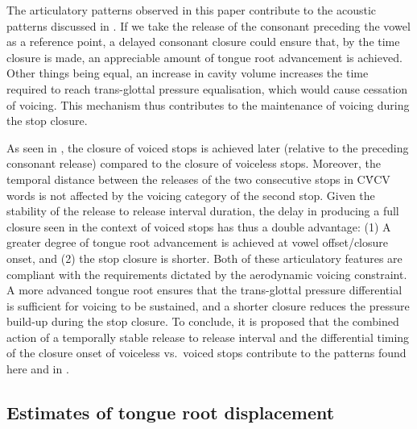 \documentclass[
  12pt,
]{article}
\begin{document}
The articulatory patterns observed in this paper contribute to the
acoustic patterns discussed in \citet{coretta2018j}. If we take the
release of the consonant preceding the vowel as a reference point, a
delayed consonant closure could ensure that, by the time closure is
made, an appreciable amount of tongue root advancement is achieved.
Other things being equal, an increase in cavity volume increases the
time required to reach trans-glottal pressure equalisation, which would
cause cessation of voicing. This mechanism thus contributes to the
maintenance of voicing during the stop closure.

As seen in \citet{coretta2018j}, the closure of voiced stops is achieved
later (relative to the preceding consonant release) compared to the
closure of voiceless stops. Moreover, the temporal distance between the
releases of the two consecutive stops in CV́CV words is not affected by
the voicing category of the second stop. Given the stability of the
release to release interval duration, the delay in producing a full
closure seen in the context of voiced stops has thus a double advantage:
(1) A greater degree of tongue root advancement is achieved at vowel
offset/closure onset, and (2) the stop closure is shorter. Both of these
articulatory features are compliant with the requirements dictated by
the aerodynamic voicing constraint. A more advanced tongue root ensures
that the trans-glottal pressure differential is sufficient for voicing
to be sustained, and a shorter closure reduces the pressure build-up
during the stop closure. To conclude, it is proposed that the combined
action of a temporally stable release to release interval and the
differential timing of the closure onset of voiceless vs.~voiced stops
contribute to the patterns found here and in \citet{coretta2018j}.

\hypertarget{estimates-of-tongue-root-displacement}{%
\subsection{Estimates of tongue root
displacement}\label{estimates-of-tongue-root-displacement}}
\end{document}
